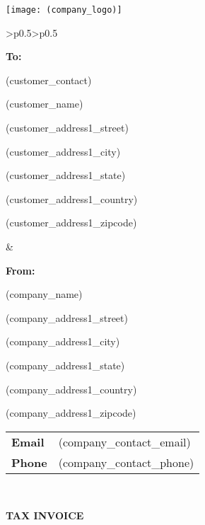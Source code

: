 \documentclass[english]{article}
\providecommand{\tabularnewline}{\\}
\begin{document}
\noindent \texttt{[image: (company\_logo)]}
		

\noindent \begin{tabular}{>{\centering}p{}>{\centering}p{}}
\noindent \begin{flushleft}
\textbf{To:}

(customer\_contact)

(customer\_name)


(customer\_address1\_street)

(customer\_address1\_city)

(customer\_address1\_state)

(customer\_address1\_country)

(customer\_address1\_zipcode)

\par\end{flushleft}
& \begin{flushleft}
\textbf{From:}

(company\_name)

(company\_address1\_street)

(company\_address1\_city)

(company\_address1\_state)

(company\_address1\_country)

(company\_address1\_zipcode)

\vspace{5mm}

\begin{tabular}{ll}
\textbf{Email} & (company\_contact\_email) \tabularnewline
\textbf{Phone} & (company\_contact\_phone) \tabularnewline
\end{tabular}

\par\end{flushleft}
\tabularnewline
\end{tabular}

\noindent \vspace{10mm}


\noindent \textbf{TAX INVOICE}

\vspace{5mm}
\noindent \begin{tabular}{ll}
\end{tabular}

\noindent \vspace{10mm}
\end{document}
